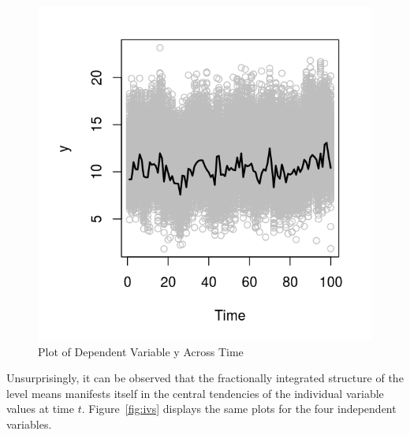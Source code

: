 \documentclass[12pt]{paper}\usepackage[]{graphicx}\usepackage[]{color}
\makeatletter
\def\maxwidth{ %
  \ifdim\Gin@nat@width>\linewidth
    \linewidth
  \else
    \Gin@nat@width
  \fi
}
\newenvironment{knitrout}{}{} %
\makeatother
\begin{document}
\begin{figure}[ht]\centering
\caption{Plot of Dependent Variable y Across Time}\label{fig:dv}
\begin{knitrout}
\color{fgcolor}
\includegraphics[width=\maxwidth]{figure/unnamed-chunk-6-1} 

\end{knitrout}
\end{figure}

Unsurprisingly, it can be observed that the fractionally integrated structure of the level means manifests itself in the central tendencies of the individual variable values at time $t$. Figure~\ref{fig:ivs} displays the same plots for the four independent variables.
\end{document}
